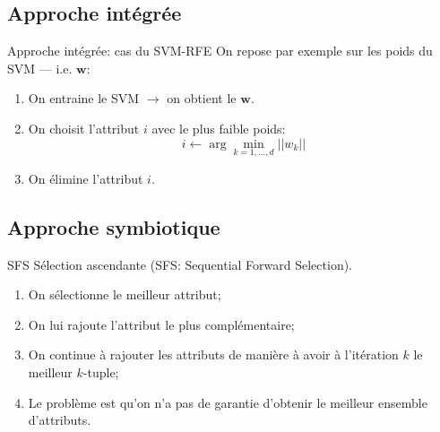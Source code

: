 \documentclass[8pt]{beamer}
\begin{document}
	\subsection[integrated approach]{Approche intégrée}
	\begin{frame}{Approche intégrée: cas du SVM-RFE}
		On repose par exemple sur les poids du SVM --- i.e.  $ \textbf{w}$:
		\begin{enumerate}
			\item<1-> On entraine le SVM $\longrightarrow$ on obtient le $\textbf{w}$.
			\item<2-> On choisit l'attribut $i$ avec le plus faible poids:
			$$ i \leftarrow \arg \min_{k=1,\dots,d}{\vert\vert w_k\vert\vert}$$
			\item<3-> On élimine l'attribut $i$.
		\end{enumerate}
	\end{frame}

	\subsection[symbiotic approach]{Approche symbiotique}
	\begin{frame}{SFS}
		Sélection ascendante (SFS\@: Sequential Forward Selection).
		\begin{enumerate}
		\item<1-> On sélectionne le meilleur attribut;
		\item<2-> On lui rajoute l'attribut le plus complémentaire;
		\item<3-> On continue à rajouter les attributs de manière à avoir à l'itération $k$ le meilleur $k$-tuple;
		\item <4-> Le problème est qu'on n'a pas de garantie d'obtenir le meilleur ensemble d'attributs.
		\end{enumerate}
	\end{frame}
\end{document}
